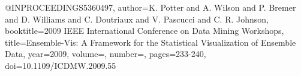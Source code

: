 @INPROCEEDINGS{5360497,
  author={K. {Potter} and A. {Wilson} and P. {Bremer} and D. {Williams} and C. {Doutriaux} and V. {Pascucci} and C. R. {Johnson}},
  booktitle={2009 IEEE International Conference on Data Mining Workshops}, 
  title={Ensemble-Vis: A Framework for the Statistical Visualization of Ensemble Data}, 
  year={2009},
  volume={},
  number={},
  pages={233-240},
  doi={10.1109/ICDMW.2009.55}}
